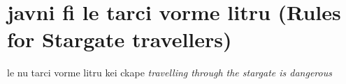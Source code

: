\documentclass{article}
\newcommand{\dualSection}[2]{#1 \emph{#2}}
\begin{document}
\section{javni fi le tarci vorme litru (Rules for Stargate travellers)}

\dualSection{le nu tarci vorme litru kei ckape}{travelling through the stargate is dangerous}
\end{document}
